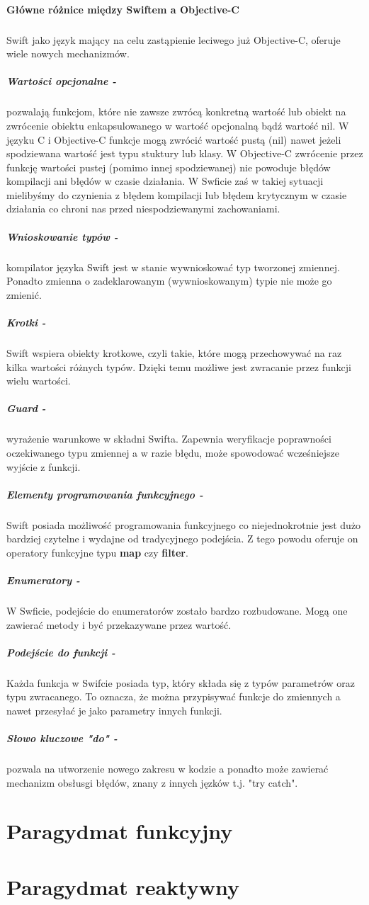 \documentclass[11pt,twoside,a4paper]{report}
\begin{document}
\paragraph{Główne różnice między Swiftem a Objective-C}
\subparagraph{}Swift jako język mający na celu zastąpienie leciwego już Objective-C, oferuje wiele nowych mechanizmów.
\subparagraph{Wartości opcjonalne - } pozwalają funkcjom, które nie zawsze zwrócą konkretną wartość lub obiekt na zwrócenie obiektu enkapsulowanego w wartość opcjonalną bądź wartość nil. W języku C i Objective-C funkcje mogą zwrócić wartość pustą (nil) nawet jeżeli spodziewana wartość jest typu stuktury lub klasy. W Objective-C zwrócenie przez funkcję wartości pustej (pomimo innej spodziewanej) nie powoduje błędów kompilacji ani błędów w czasie działania. W Swficie zaś w takiej sytuacji mielibyśmy do czynienia z błędem kompilacji lub błędem krytycznym w czasie działania co chroni nas przed niespodziewanymi zachowaniami.
\subparagraph{Wnioskowanie typów - } kompilator języka Swift jest w stanie wywnioskować typ tworzonej zmiennej. Ponadto zmienna o zadeklarowanym (wywnioskowanym) typie nie może go zmienić.
\subparagraph{Krotki - } Swift wspiera obiekty krotkowe, czyli takie, które mogą przechowywać na raz kilka wartości różnych typów. Dzięki temu możliwe jest zwracanie przez funkcji wielu wartości.
\subparagraph{Guard - } wyrażenie warunkowe w składni Swifta. Zapewnia weryfikacje poprawności oczekiwanego typu zmiennej a w razie błędu, może spowodować wcześniejsze wyjście z funkcji.
\subparagraph{Elementy programowania funkcyjnego - } Swift posiada możliwość programowania funkcyjnego co niejednokrotnie jest dużo bardziej czytelne i wydajne od tradycyjnego podejścia. Z tego powodu oferuje on operatory funkcyjne typu \textbf{map} czy \textbf{filter}.       
\subparagraph{Enumeratory - } W Swficie, podejście do enumeratorów zostało bardzo rozbudowane. Mogą one zawierać metody i być przekazywane przez wartość.
\subparagraph{Podejście do funkcji - } Każda funkcja w Swifcie posiada typ, który składa się z typów parametrów oraz typu zwracanego. To oznacza, że można przypisywać funkcje do zmiennych a nawet przesyłać je jako parametry innych funkcji.
\subparagraph{Słowo kluczowe "do" - } pozwala na utworzenie nowego zakresu w kodzie a ponadto może zawierać mechanizm obsłusgi błędów, znany z innych jęzków t.j. "try catch". \cite{swiftObjcDiff}
\section{Paragydmat funkcyjny}
\section{Paragydmat reaktywny}
\end{document}
